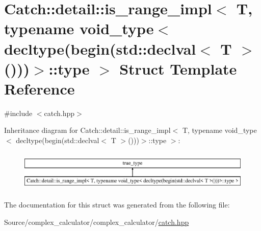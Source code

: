 \hypertarget{struct_catch_1_1detail_1_1is__range__impl_3_01_t_00_01typename_01void__type_3_01decltype_07begin8604ecb9de16ea7789f2f694ac896ffd}{}\section{Catch\+:\+:detail\+:\+:is\+\_\+range\+\_\+impl$<$ T, typename void\+\_\+type$<$ decltype(begin(std\+:\+:declval$<$ T $>$()))$>$\+:\+:type $>$ Struct Template Reference}
\label{struct_catch_1_1detail_1_1is__range__impl_3_01_t_00_01typename_01void__type_3_01decltype_07begin8604ecb9de16ea7789f2f694ac896ffd}


{\ttfamily \#include $<$catch.\+hpp$>$}

Inheritance diagram for Catch\+:\+:detail\+:\+:is\+\_\+range\+\_\+impl$<$ T, typename void\+\_\+type$<$ decltype(begin(std\+:\+:declval$<$ T $>$()))$>$\+:\+:type $>$\+:\begin{figure}[H]
\begin{center}
\leavevmode
\includegraphics[height=1.954625cm]{struct_catch_1_1detail_1_1is__range__impl_3_01_t_00_01typename_01void__type_3_01decltype_07begin8604ecb9de16ea7789f2f694ac896ffd}
\end{center}
\end{figure}


The documentation for this struct was generated from the following file\+:\begin{DoxyCompactItemize}
\item 
Source/complex\+\_\+calculator/complex\+\_\+calculator/\mbox{\hyperlink{catch_8hpp}{catch.\+hpp}}\end{DoxyCompactItemize}
